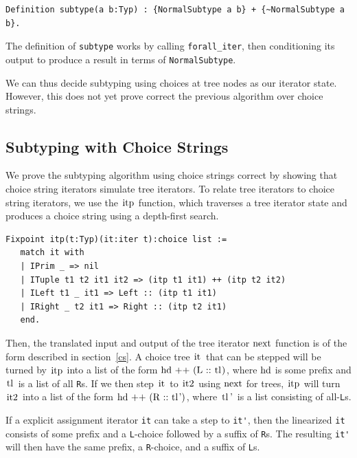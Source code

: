 \documentclass[a4paper,english]{lipics-v2019}
\renewcommand{\L}{{\tt L}\xspace}
\newcommand{\Ls}{{\tt L}s\xspace}
\newcommand{\R}{{\tt R}\xspace}
\newcommand{\Rs}{{\tt R}s\xspace}
\renewcommand{\c}[1]{\ensuremath{\text{\lstinline{#1}}}\xspace}
\begin{document}
\begin{small}\begin{verbatim}
Definition subtype(a b:Typ) : {NormalSubtype a b} + {~NormalSubtype a b}.
\end{verbatim}\end{small}

\noindent The definition of \verb|subtype| works by calling \verb|forall_iter|, then
conditioning its output to produce a result in terms of \verb|NormalSubtype|. 

We can thus decide subtyping using choices at tree nodes as our iterator state.
However, this does not yet prove correct the previous algorithm over choice strings.

\subsection{Subtyping with Choice Strings}

We prove the subtyping algorithm using choice strings correct by 
showing that choice string iterators simulate tree iterators. To 
relate tree iterators to choice string iterators, we use the \c{itp} 
function, which traverses a tree iterator state and produces a choice
string using a depth-first search.

\begin{small}\begin{verbatim}
Fixpoint itp(t:Typ)(it:iter t):choice list :=
   match it with
   | IPrim _ => nil
   | ITuple t1 t2 it1 it2 => (itp t1 it1) ++ (itp t2 it2)
   | ILeft t1 _ it1 => Left :: (itp t1 it1)
   | IRight _ t2 it1 => Right :: (itp t2 it1)
   end.
\end{verbatim}\end{small}

Then, the translated input and output of the tree iterator \c{next}
function is of the form described in section~\ref{cs}. A choice tree \c{it}
that can be stepped will be turned by \c{itp} into a list of the form
\c{hd ++ (L :: tl)}, where \c{hd} is some prefix and \c{tl} is a list of 
all \Rs. If we then step \c{it} to \c{it2} using \c{next} for trees,
\c{itp} will turn \c{it2} into a list of the form \c{hd ++ (R :: tl')},
where \c{tl'} is a list consisting of all-\Ls.

\begin{lemma}
\label{lem:snt}
If a explicit assignment iterator \verb|it| can take a step to \verb|it'|, then
the linearized \verb|it| consists of some prefix and a \L-choice followed by a suffix of \Rs.
The resulting \verb|it'| will then have the same prefix, a \R-choice, and a suffix of \Ls.
\end{lemma}
\end{document}
